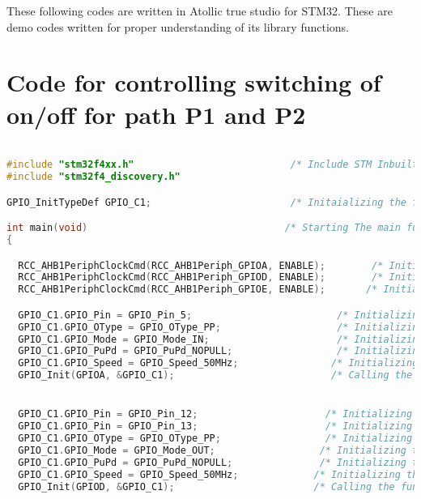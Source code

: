These following codes are written in Atollic true studio for STM32. These are demo codes written for proper understanding of its library functions.

\section{Code for controlling switching of on/off for path P1 and P2}
\begin{lstlisting}[language=C++]

#include "stm32f4xx.h"                           /* Include STM Inbuilt Library*/
#include "stm32f4_discovery.h"

GPIO_InitTypeDef GPIO_C1;                        /* Initaializing the function */

int main(void)                                  /* Starting The main function */
{

  RCC_AHB1PeriphClockCmd(RCC_AHB1Periph_GPIOA, ENABLE);        /* Initializing the clock for portA and enabling it */
  RCC_AHB1PeriphClockCmd(RCC_AHB1Periph_GPIOD, ENABLE);        /* Initializing the clock for portD and enabling it */
  RCC_AHB1PeriphClockCmd(RCC_AHB1Periph_GPIOE, ENABLE);       /* Initializing the clock for portE and enabling it */

  GPIO_C1.GPIO_Pin = GPIO_Pin_5;                         /* Initializing the Pin PA5 */
  GPIO_C1.GPIO_OType = GPIO_OType_PP;                    /* Initializing the Pin to work in push pull mode */
  GPIO_C1.GPIO_Mode = GPIO_Mode_IN;                      /* Initializing the Pin PA5 to work in Input Mode */
  GPIO_C1.GPIO_PuPd = GPIO_PuPd_NOPULL;                  /* Initializing the Pin PA5 to work as No pull means no low or high */
  GPIO_C1.GPIO_Speed = GPIO_Speed_50MHz;                /* Initializing the spped of clock pulse */
  GPIO_Init(GPIOA, &GPIO_C1);                           /* Calling the function Init by passing two values*/


  GPIO_C1.GPIO_Pin = GPIO_Pin_12;                      /* Initializing the Pin PD12 */
  GPIO_C1.GPIO_Pin = GPIO_Pin_13;                      /* Initializing the Pin PD13 */
  GPIO_C1.GPIO_OType = GPIO_OType_PP;                  /* Initializing the Pin PD12, PD13 to work in Push Pull Mode */
  GPIO_C1.GPIO_Mode = GPIO_Mode_OUT;                  /* Initializing the Pin PD12, PD13 to work in output mode */
  GPIO_C1.GPIO_PuPd = GPIO_PuPd_NOPULL;               /* Initializing the Pin PD12, PD13 to work as no pull mode */
  GPIO_C1.GPIO_Speed = GPIO_Speed_50MHz;             /* Initializing the spped of clock pulse */
  GPIO_Init(GPIOD, &GPIO_C1);                        /* Calling the function Init by passing two values*/



\end{lstlisting}
